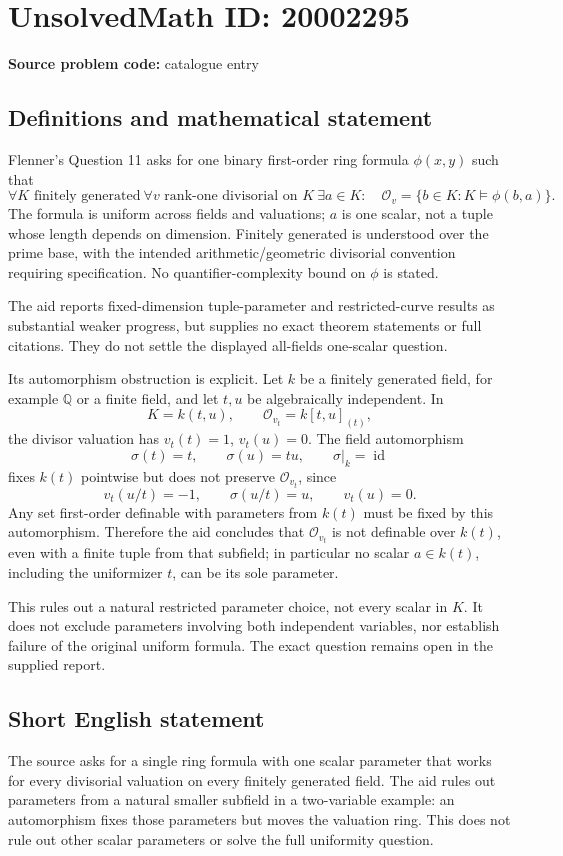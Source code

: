 \documentclass[11pt]{article}
\begin{document}
\section*{UnsolvedMath ID: 20002295}
\textbf{Source problem code:} catalogue entry
\subsection{Definitions and mathematical statement}
Flenner's Question 11 asks for one binary first-order ring formula \(\phi(x,y)\) such that
\[
 \forall K\text{ finitely generated}\ \forall v\text{ rank-one divisorial on }K
 \ \exists a\in K:\quad
 \mathcal O_v=\{b\in K:K\models\phi(b,a)\}.
\]
The formula is uniform across fields and valuations; \(a\) is one scalar, not a tuple whose length depends on dimension. Finitely generated is understood over the prime base, with the intended arithmetic/geometric divisorial convention requiring specification. No quantifier-complexity bound on \(\phi\) is stated.

The aid reports fixed-dimension tuple-parameter and restricted-curve results as substantial weaker progress, but supplies no exact theorem statements or full citations. They do not settle the displayed all-fields one-scalar question.

Its automorphism obstruction is explicit. Let \(k\) be a finitely generated field, for example \(\mathbb Q\) or a finite field, and let \(t,u\) be algebraically independent. In
\[
 K=k(t,u),\qquad
 \mathcal O_{v_t}=k[t,u]_{(t)},
\]
the divisor valuation has \(v_t(t)=1\), \(v_t(u)=0\). The field automorphism
\[
 \sigma(t)=t,\qquad\sigma(u)=tu,\qquad\sigma|_k=\operatorname{id}
\]
fixes \(k(t)\) pointwise but does not preserve \(\mathcal O_{v_t}\), since
\[
 v_t(u/t)=-1,\qquad
 \sigma(u/t)=u,\qquad v_t(u)=0.
\]
Any set first-order definable with parameters from \(k(t)\) must be fixed by this automorphism. Therefore the aid concludes that \(\mathcal O_{v_t}\) is not definable over \(k(t)\), even with a finite tuple from that subfield; in particular no scalar \(a\in k(t)\), including the uniformizer \(t\), can be its sole parameter.

This rules out a natural restricted parameter choice, not every scalar in \(K\). It does not exclude parameters involving both independent variables, nor establish failure of the original uniform formula. The exact question remains open in the supplied report.
\subsection{Short English statement}
The source asks for a single ring formula with one scalar parameter that works for every divisorial valuation on every finitely generated field. The aid rules out parameters from a natural smaller subfield in a two-variable example: an automorphism fixes those parameters but moves the valuation ring. This does not rule out other scalar parameters or solve the full uniformity question.
\end{document}
